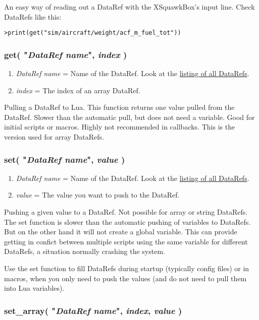 \documentclass[11pt,parskip=half,a4paper]{scrartcl}
\begin{document}
An easy way of reading out a DataRef with the XSquawkBox's input line. Check DataRefs like this:

\verb|>print(get("sim/aircraft/weight/acf_m_fuel_tot"))|

\subsubsection{get( "\emph{DataRef name}", \emph{index} )}

\begin{enumerate}
	\item \emph{DataRef name} = Name of the DataRef. Look at the \href{http://www.xsquawkbox.net/xpsdk/docs/DataRefs.html}{listing of all DataRefs}.
	\item \emph{index} = The index of an array DataRef.
\end{enumerate}

Pulling a DataRef to Lua. This function returns one value pulled from the DataRef. Slower than the automatic pull, but does not need a variable. Good for initial scripts or macros. Highly not recommended in callbacks. This is the version used for array DataRefs.

\newpage
\subsubsection{set( "\emph{DataRef name}", \emph{value} )}

\begin{enumerate}
	\item \emph{DataRef name} = Name of the DataRef. Look at the \href{http://www.xsquawkbox.net/xpsdk/docs/DataRefs.html}{listing of all DataRefs}.
	\item \emph{value} = The value you want to push to the DataRef.
\end{enumerate}

Pushing a given value to a DataRef. Not possible for array or string DataRefs. The set function is slower than the automatic pushing of variables to DataRefs. But on the other hand it will not create a global variable. This can provide getting in confict between multiple scripts using the same variable for different DataRefs, a situation normally crashing the system.

Use the set function to fill DataRefs during startup (typically config files) or in macros, when you only need to push the values (and do not need to pull them into Lua variables).

\subsubsection{set\_array( "\emph{DataRef name}", \emph{index}, \emph{value} )}
\end{document}
